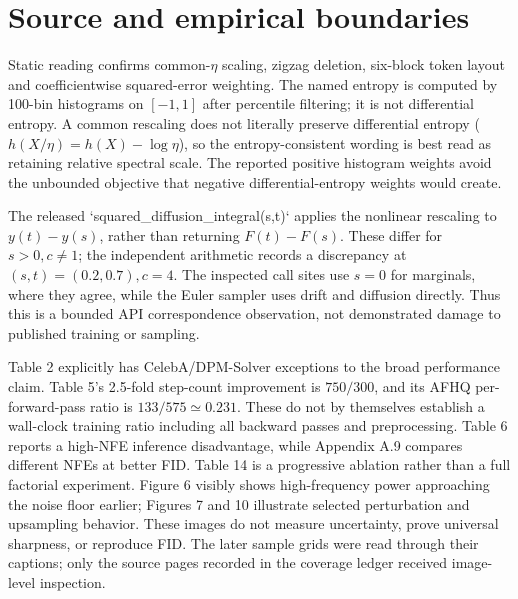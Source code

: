 \documentclass[10pt]{article}
\begin{document}
\section*{Source and empirical boundaries}
Static reading confirms common-\(\eta\) scaling, zigzag deletion, six-block token layout and coefficientwise squared-error weighting. The named entropy is computed by 100-bin histograms on \([-1,1]\) after percentile filtering; it is not differential entropy. A common rescaling does not literally preserve differential entropy (\(h(X/\eta)=h(X)-\log\eta\)), so the entropy-consistent wording is best read as retaining relative spectral scale. The reported positive histogram weights avoid the unbounded objective that negative differential-entropy weights would create.\par
The released `squared\_diffusion\_integral(s,t)` applies the nonlinear rescaling to \(y(t)-y(s)\), rather than returning \(F(t)-F(s)\). These differ for \(s>0,c\ne1\); the independent arithmetic records a discrepancy at \((s,t)=(0.2,0.7),c=4\). The inspected call sites use \(s=0\) for marginals, where they agree, while the Euler sampler uses drift and diffusion directly. Thus this is a bounded API correspondence observation, not demonstrated damage to published training or sampling.\par
Table 2 explicitly has CelebA/DPM-Solver exceptions to the broad performance claim. Table 5’s 2.5-fold step-count improvement is \(750/300\), and its AFHQ per-forward-pass ratio is \(133/575\simeq0.231\). These do not by themselves establish a wall-clock training ratio including all backward passes and preprocessing. Table 6 reports a high-NFE inference disadvantage, while Appendix A.9 compares different NFEs at better FID. Table 14 is a progressive ablation rather than a full factorial experiment. Figure 6 visibly shows high-frequency power approaching the noise floor earlier; Figures 7 and 10 illustrate selected perturbation and upsampling behavior. These images do not measure uncertainty, prove universal sharpness, or reproduce FID. The later sample grids were read through their captions; only the source pages recorded in the coverage ledger received image-level inspection.\par
\end{document}
